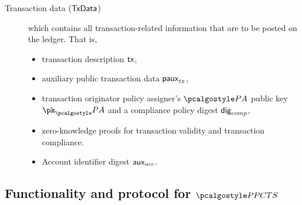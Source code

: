 \documentclass[runningheads,10pt]{llncs}
\numberwithin{equation}{section}
\begin{document}
\begin{description}
\item[Transaction data ($\mathsf{TxData}$)] which contains all transaction-related
  information that are to be posted on the ledger. That is,
  \begin{itemize}
  \item transaction description $\mathsf{tx}$, 
  \item auxiliary public transaction data $\mathsf{paux}_{tx}$,
  \item transaction originator policy assigner's $\polas$ public key $\pk_\polas$ and a compliance policy
    digest $\mathsf{dig}_{comp}$,
  \item zero-knowledge proofs for transaction validity and transaction
  compliance.
\item Account identifier digest $\mathsf{aux}_{acc}$.
  \end{itemize}
\end{description}

\subsection{Functionality and protocol for $\PPCTS$}
\end{document}
